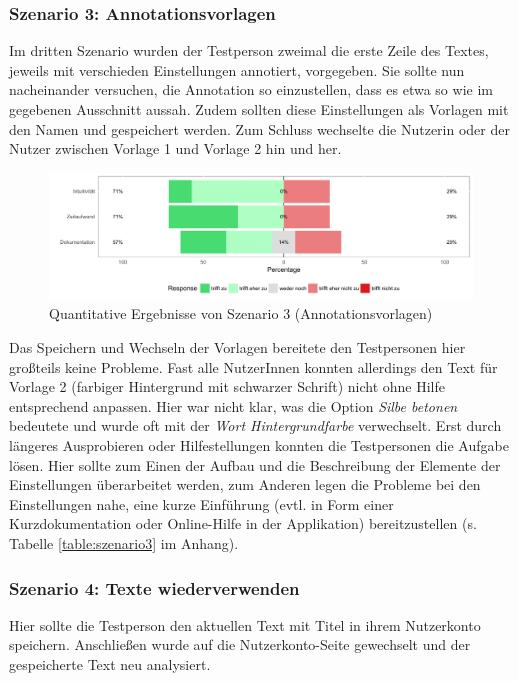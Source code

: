 \subsubsection{Szenario 3: Annotationsvorlagen}

Im dritten Szenario wurden der Testperson zweimal die erste Zeile des Textes, jeweils mit verschieden Einstellungen annotiert, vorgegeben. Sie sollte nun nacheinander versuchen, die Annotation so einzustellen, dass es etwa so wie im gegebenen Ausschnitt aussah. Zudem sollten diese Einstellungen als Vorlagen mit den Namen  und  gespeichert werden. Zum Schluss wechselte die Nutzerin oder der Nutzer zwischen Vorlage 1 und Vorlage 2 hin und her.

\begin{figure}[h!]
	\centering
	\includegraphics[width=.8\linewidth]{figures/evaluation/scenario3}
	\caption{Quantitative Ergebnisse von Szenario 3 (Annotationsvorlagen)}
	\label{fig:evaluation-sc3}
\end{figure}

Das Speichern und Wechseln der Vorlagen bereitete den Testpersonen hier großteils keine Probleme. Fast alle NutzerInnen konnten allerdings den Text für Vorlage 2 (farbiger Hintergrund mit schwarzer Schrift) nicht ohne Hilfe entsprechend anpassen. Hier war nicht klar, was die Option \textit{Silbe betonen} bedeutete und wurde oft mit der \textit{Wort Hintergrundfarbe} verwechselt. Erst durch längeres Ausprobieren oder Hilfestellungen konnten die Testpersonen die Aufgabe lösen. Hier sollte zum Einen der Aufbau und die Beschreibung der Elemente der Einstellungen überarbeitet werden, zum Anderen legen die Probleme bei den Einstellungen nahe, eine kurze Einführung (evtl. in Form einer Kurzdokumentation oder Online-Hilfe in der Applikation) bereitzustellen (s. Tabelle \ref{table:szenario3} im Anhang).

\subsubsection{Szenario 4: Texte wiederverwenden}

Hier sollte die Testperson den aktuellen Text mit Titel in ihrem Nutzerkonto speichern. Anschließen wurde auf die Nutzerkonto-Seite gewechselt und der gespeicherte Text neu analysiert.

